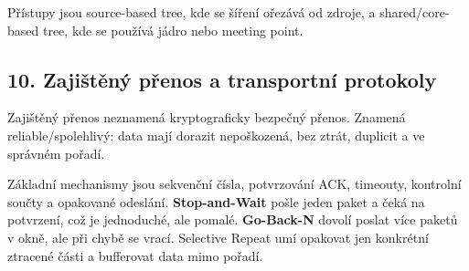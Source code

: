 Přístupy jsou source-based tree, kde se šíření ořezává od zdroje, a shared/core-based tree, kde se používá jádro nebo meeting point.

\subsection*{10. Zajištěný přenos a transportní protokoly}

Zajištěný přenos neznamená kryptograficky bezpečný přenos. Znamená reliable/spolehlivý: data mají dorazit nepoškozená, bez ztrát, duplicit a ve správném pořadí.

Základní mechanismy jsou sekvenční čísla, potvrzování ACK, timeouty, kontrolní součty a opakované odeslání. \textbf{Stop-and-Wait} pošle jeden paket a čeká na potvrzení, což je jednoduché, ale pomalé. \textbf{Go-Back-N} dovolí poslat více paketů v okně, ale při chybě se vrací. Selective Repeat umí opakovat jen konkrétní ztracené části a bufferovat data mimo pořadí.


